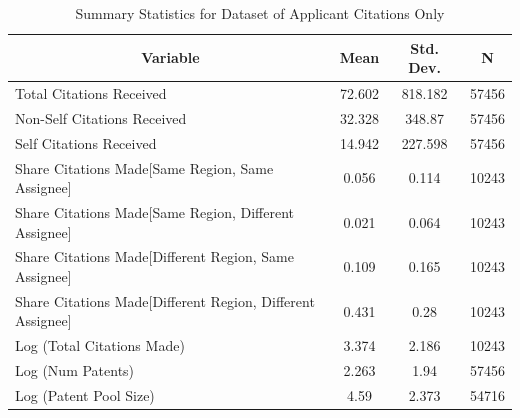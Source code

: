 \documentclass[12pt,letterpaper]{article}
\begin{document}
\begin{table}[htbp]\centering \caption{Summary Statistics for Dataset of Applicant Citations Only \label{a.sumstat}}
\scriptsize
\singlespacing
\begin{tabular}{l c c  c}\hline\hline
\multicolumn{1}{c}{\textbf{Variable}} & \textbf{Mean}
 & \textbf{Std. Dev.} & \textbf{N}\\ \hline
Total Citations Received & 72.602 & 818.182  & 57456\\
Non-Self Citations Received& 32.328 & 348.87  & 57456\\
Self Citations Received& 14.942 & 227.598  & 57456\\
Share Citations Made[Same Region, Same Assignee] & 0.056 & 0.114  & 10243\\
Share Citations Made[Same Region, Different Assignee] & 0.021 & 0.064  & 10243\\
Share Citations Made[Different Region, Same Assignee] & 0.109 & 0.165  & 10243\\
Share Citations Made[Different Region, Different Assignee] & 0.431 & 0.28  & 10243\\
Log (Total Citations Made) & 3.374 & 2.186  & 10243\\
Log (Num Patents) & 2.263 & 1.94  & 57456\\
Log (Patent Pool Size) & 4.59 & 2.373  & 54716\\\hline
\end{tabular}
\end{table}
\end{document}
